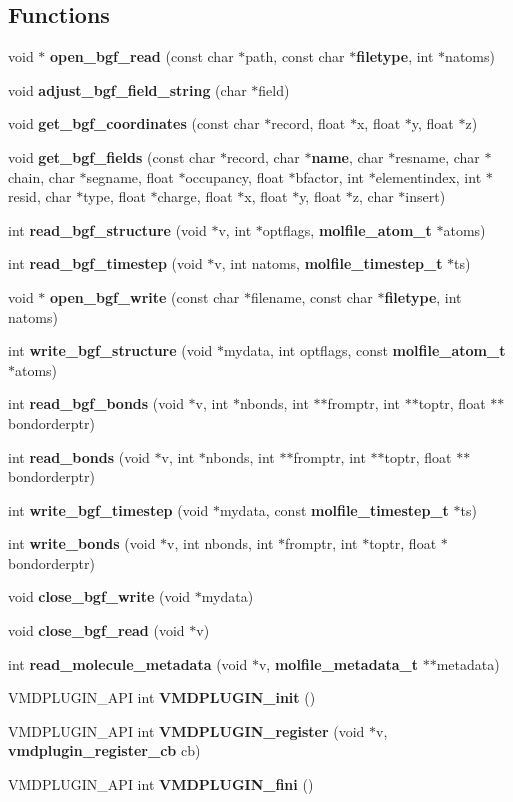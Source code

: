 \subsection*{Functions}
\begin{CompactItemize}
\item 
void $\ast$ {\bf open\_\-bgf\_\-read} (const char $\ast$path, const char $\ast${\bf filetype}, int $\ast$natoms)
\item 
void {\bf adjust\_\-bgf\_\-field\_\-string} (char $\ast$field)
\item 
void {\bf get\_\-bgf\_\-coordinates} (const char $\ast$record, float $\ast$x, float $\ast$y, float $\ast$z)
\item 
void {\bf get\_\-bgf\_\-fields} (const char $\ast$record, char $\ast${\bf name}, char $\ast$resname, char $\ast$chain, char $\ast$segname, float $\ast$occupancy, float $\ast$bfactor, int $\ast$elementindex, int $\ast$resid, char $\ast$type, float $\ast$charge, float $\ast$x, float $\ast$y, float $\ast$z, char $\ast$insert)
\item 
int {\bf read\_\-bgf\_\-structure} (void $\ast$v, int $\ast$optflags, {\bf molfile\_\-atom\_\-t} $\ast$atoms)
\item 
int {\bf read\_\-bgf\_\-timestep} (void $\ast$v, int natoms, {\bf molfile\_\-timestep\_\-t} $\ast$ts)
\item 
void $\ast$ {\bf open\_\-bgf\_\-write} (const char $\ast$filename, const char $\ast${\bf filetype}, int natoms)
\item 
int {\bf write\_\-bgf\_\-structure} (void $\ast$mydata, int optflags, const {\bf molfile\_\-atom\_\-t} $\ast$atoms)
\item 
int {\bf read\_\-bgf\_\-bonds} (void $\ast$v, int $\ast$nbonds, int $\ast$$\ast$fromptr, int $\ast$$\ast$toptr, float $\ast$$\ast$bondorderptr)
\item 
int {\bf read\_\-bonds} (void $\ast$v, int $\ast$nbonds, int $\ast$$\ast$fromptr, int $\ast$$\ast$toptr, float $\ast$$\ast$bondorderptr)
\item 
int {\bf write\_\-bgf\_\-timestep} (void $\ast$mydata, const {\bf molfile\_\-timestep\_\-t} $\ast$ts)
\item 
int {\bf write\_\-bonds} (void $\ast$v, int nbonds, int $\ast$fromptr, int $\ast$toptr, float $\ast$bondorderptr)
\item 
void {\bf close\_\-bgf\_\-write} (void $\ast$mydata)
\item 
void {\bf close\_\-bgf\_\-read} (void $\ast$v)
\item 
int {\bf read\_\-molecule\_\-metadata} (void $\ast$v, {\bf molfile\_\-metadata\_\-t} $\ast$$\ast$metadata)
\item 
VMDPLUGIN\_\-API int {\bf VMDPLUGIN\_\-init} ()
\item 
VMDPLUGIN\_\-API int {\bf VMDPLUGIN\_\-register} (void $\ast$v, {\bf vmdplugin\_\-register\_\-cb} cb)
\item 
VMDPLUGIN\_\-API int {\bf VMDPLUGIN\_\-fini} ()
\end{CompactItemize}
